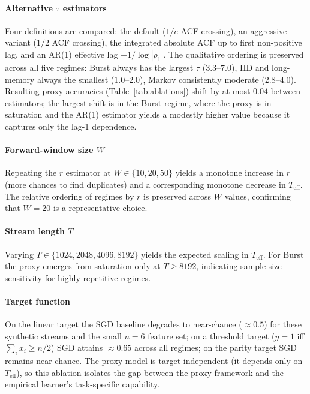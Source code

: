 \documentclass[preprint,12pt,authoryear]{elsarticle}
\newcommand{\Teff}{T_{\mathrm{eff}}}
\begin{document}
\paragraph{Alternative $\tau$ estimators} Four definitions are compared: the default ($1/e$ ACF crossing), an aggressive variant ($1/2$ ACF crossing), the integrated absolute ACF up to first non-positive lag, and an AR(1) effective lag $-1/\log|\rho_1|$. The qualitative ordering is preserved across all five regimes: Burst always has the largest $\tau$ ($3.3$--$7.0$), IID and long-memory always the smallest ($1.0$--$2.0$), Markov consistently moderate ($2.8$--$4.0$). Resulting proxy accuracies (Table~\ref{tab:ablations}) shift by at most $0.04$ between estimators; the largest shift is in the Burst regime, where the proxy is in saturation and the AR(1) estimator yields a modestly higher value because it captures only the lag-1 dependence.

\paragraph{Forward-window size $W$} Repeating the $r$ estimator at $W \in \{10, 20, 50\}$ yields a monotone increase in $r$ (more chances to find duplicates) and a corresponding monotone decrease in $\Teff$. The relative ordering of regimes by $r$ is preserved across $W$ values, confirming that $W = 20$ is a representative choice.

\paragraph{Stream length $T$} Varying $T \in \{1024, 2048, 4096, 8192\}$ yields the expected scaling in $\Teff$. For Burst the proxy emerges from saturation only at $T \geq 8192$, indicating sample-size sensitivity for highly repetitive regimes.

\paragraph{Target function} On the linear target the SGD baseline degrades to near-chance ($\approx 0.5$) for these synthetic streams and the small $n=6$ feature set; on a threshold target ($y = 1$ iff $\sum_i x_i \geq n/2$) SGD attains $\approx 0.65$ across all regimes; on the parity target SGD remains near chance. The proxy model is target-independent (it depends only on $\Teff$), so this ablation isolates the gap between the proxy framework and the empirical learner's task-specific capability.
\end{document}
